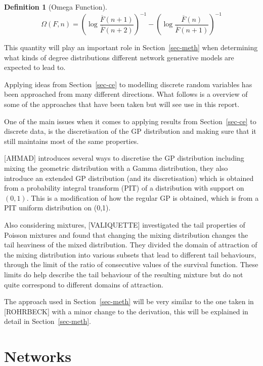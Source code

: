 \documentclass[
  10pt,
  a4paper,
]{scrreprt}
\theoremstyle{definition}
\newtheorem{definition}{Definition}[section]
\theoremstyle{plain}
\theoremstyle{remark}
\begin{document}
{\begin{definition}[Omega
Function]
\[
\Omega(F,n) = \left(\log\frac{\overline F (n+1)}{\overline F (n+2)}\right)^{-1} - \left(\log\frac{\overline F (n)}{\overline F (n+1)}\right)^{-1}
\]

\end{definition}

This quantity will play an important role in Section~\ref{sec-meth} when
determining what kinds of degree distributions different network
generative models are expected to lead to.

Applying ideas from Section~\ref{sec-ce} to modelling discrete random
variables has been approached from many different directions. What
follows is a overview of some of the approaches that have been taken but
will see use in this report.

One of the main issues when it comes to applying results from
Section~\ref{sec-ce} to discrete data, is the discretisation of the GP
distribution and making sure that it still maintains most of the same
properties.

{[}AHMAD{]} introduces several ways to discretise the GP distribution
including mixing the geometric distribution with a Gamma distribution,
they also introduce an extended GP distribution (and its discretisation)
which is obtained from a probability integral transform (PIT) of a
distribution with support on \((0,1)\). This is a modification of how
the regular GP is obtained, which is from a PIT uniform distribution on
(0,1).

Also considering mixtures, {[}VALIQUETTE{]} investigated the tail
properties of Poisson mixtures and found that changing the mixing
distribution changes the tail heaviness of the mixed distribution. They
divided the domain of attraction of the mixing distribution into various
subsets that lead to different tail behaviours, through the limit of the
ratio of consecutive values of the survival function. These limits do
help describe the tail behaviour of the resulting mixture but do not
quite correspond to different domains of attraction.

The approach used in Section~\ref{sec-meth} will be very similar to the
one taken in {[}ROHRBECK{]} with a minor change to the derivation, this
will be explained in detail in Section~\ref{sec-meth}.

\hypertarget{networks}{%
\chapter{Networks}\label{networks}}

}
\end{document}
